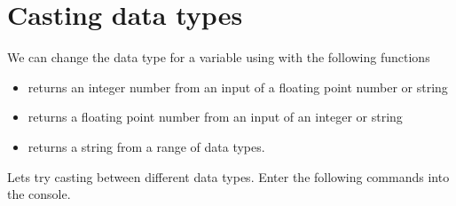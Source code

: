\documentclass[letterpaper,10pt,english]{jupyterBook}
\begin{document}
\part{Casting data types}
\label{\detokenize{_pages/1.4_Python_data_types:casting-data-types}}
\sphinxAtStartPar
We can change the data type for a variable using  with the following functions
\begin{itemize}
\item {} 
\sphinxAtStartPar
{} \sphinxhyphen{} returns an integer number from an input of a floating point number or string

\item {} 
\sphinxAtStartPar
{} \sphinxhyphen{} returns a floating point number from an input of an integer or string

\item {} 
\sphinxAtStartPar
{} \sphinxhyphen{} returns a string from a range of data types.

\end{itemize}

\sphinxAtStartPar
Lets try casting between different data types. Enter the following commands into the console.
\end{document}
